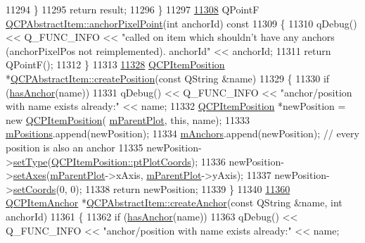 \begin{DoxyCode}
11294   \}
11295   \textcolor{keywordflow}{return} result;
11296 \}
11297 
\hypertarget{a00115_source_l11308}{}\hyperlink{a00022_a94bde62b8a2fc133666dcbb8035deeed}{11308} QPointF \hyperlink{a00022_a94bde62b8a2fc133666dcbb8035deeed}{QCPAbstractItem::anchorPixelPoint}(\textcolor{keywordtype}{int} anchorId)\textcolor{keyword}{ const}
11309 \textcolor{keyword}{}\{
11310   qDebug() << Q\_FUNC\_INFO << \textcolor{stringliteral}{"called on item which shouldn't have any anchors (anchorPixelPos not
       reimplemented). anchorId"} << anchorId;
11311   \textcolor{keywordflow}{return} QPointF();
11312 \}
11313 
\hypertarget{a00115_source_l11328}{}\hyperlink{a00022_a75036d39c4d4e2e1a7dd145fff915d32}{11328} \hyperlink{a00038}{QCPItemPosition} *\hyperlink{a00022_a75036d39c4d4e2e1a7dd145fff915d32}{QCPAbstractItem::createPosition}(\textcolor{keyword}{const} 
      QString &name)
11329 \{
11330   \textcolor{keywordflow}{if} (\hyperlink{a00022_acbce9e5ba5252541d19db0c40303357a}{hasAnchor}(name))
11331     qDebug() << Q\_FUNC\_INFO << \textcolor{stringliteral}{"anchor/position with name exists already:"} << name;
11332   \hyperlink{a00038}{QCPItemPosition} *newPosition = \textcolor{keyword}{new} \hyperlink{a00038}{QCPItemPosition}(
      \hyperlink{a00044_aa2a528433e44db02b8aef23c1f9f90ed}{mParentPlot}, \textcolor{keyword}{this}, name);
11333   \hyperlink{a00022_af94ff71b6a15ea6d028ab8bd8eccd012}{mPositions}.append(newPosition);
11334   \hyperlink{a00022_a909a3abab783de302ebf0a0e6f2bbc15}{mAnchors}.append(newPosition); \textcolor{comment}{// every position is also an anchor}
11335   newPosition->\hyperlink{a00038_aa476abf71ed8fa4c537457ebb1a754ad}{setType}(\hyperlink{a00038_aad9936c22bf43e3d358552f6e86dbdc8ad5ffb8dc99ad73263f7010c77342294c}{QCPItemPosition::ptPlotCoords});
11336   newPosition->\hyperlink{a00038_a2185f45c75ac8cb9be89daeaaad50e37}{setAxes}(\hyperlink{a00044_aa2a528433e44db02b8aef23c1f9f90ed}{mParentPlot}->xAxis, \hyperlink{a00044_aa2a528433e44db02b8aef23c1f9f90ed}{mParentPlot}->yAxis);
11337   newPosition->\hyperlink{a00038_aa988ba4e87ab684c9021017dcaba945f}{setCoords}(0, 0);
11338   \textcolor{keywordflow}{return} newPosition;
11339 \}
11340 
\hypertarget{a00115_source_l11360}{}\hyperlink{a00022_af3fc92527802078ca395138748b629a7}{11360} \hyperlink{a00032}{QCPItemAnchor} *\hyperlink{a00022_af3fc92527802078ca395138748b629a7}{QCPAbstractItem::createAnchor}(\textcolor{keyword}{const} QString &name,
       \textcolor{keywordtype}{int} anchorId)
11361 \{
11362   \textcolor{keywordflow}{if} (\hyperlink{a00022_acbce9e5ba5252541d19db0c40303357a}{hasAnchor}(name))
11363     qDebug() << Q\_FUNC\_INFO << \textcolor{stringliteral}{"anchor/position with name exists already:"} << name;

\end{DoxyCode}

